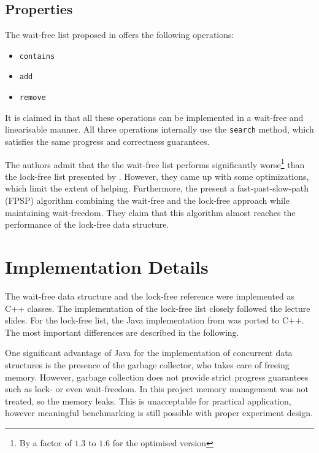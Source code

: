 \documentclass[a4paper, 12pt]{article}
\begin{document}
\subsection{Properties}

The wait-free list proposed in \cite{timnat12} offers the following operations:
\begin{itemize}
\setlength\itemsep{0em}
\item{\verb|contains|}
\item{\verb|add|}
\item{\verb|remove|}
\end{itemize}

It is claimed in \cite{timnat12} that all these operations can be implemented in a wait-free and linearisable manner. All three operations internally use the \verb|search| method, which satisfies the same progress and correctness guarantees.

The authors admit that the the wait-free list performs significantly worse\footnote{By a factor of $1.3$ to $1.6$ for the optimised version} than the lock-free list presented by \cite{harris01}. However, they came up with some optimizations, which limit the extent of helping. Furthermore, the present a fast-past-slow-path (FPSP) algorithm combining the wait-free and the lock-free approach while maintaining wait-freedom. They claim that this algorithm almost reaches the performance of the lock-free data structure.

\newpage
\section{Implementation Details}

The wait-free data structure and the lock-free reference were implemented as C++ classes. The implementation of the lock-free list closely followed the lecture slides. For the lock-free list, the Java implementation from \cite{timnat12} was ported to C++. The most important differences are described in the following.

One significant advantage of Java for the implementation of concurrent data structures is the presence of the garbage collector, who takes care of freeing memory. However, garbage collection does not provide strict progress guarantees such as lock- or even wait-freedom. In this project memory management was not treated, so the memory leaks. This is unacceptable for practical application, however meaningful benchmarking is still possible with proper experiment design.
\end{document}
